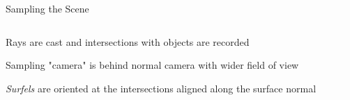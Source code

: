 \documentclass[10pt,compress,professionalfont]{beamer}
\begin{document}
\begin{frame}{Sampling the Scene}

    \begin{columns}
        \begin{column}{0.5\textwidth}

    \vspace{-5mm}
    Rays are cast and intersections with objects are recorded\\
    \vspace{8mm}

    Sampling "camera" is behind normal camera with wider field of view\\
    \vspace{8mm}

    \textit{Surfels} are oriented at the intersections aligned along the surface normal

        \end{column}
        \begin{column}{0.5\textwidth}
            \vspace{-4mm}
            \includegraphics[width=\textwidth]{../img/diag/surfel_samp_mod.pdf}\\
        \end{column}
    \end{columns}

\end{frame}
\end{document}
